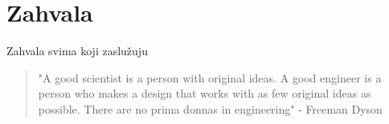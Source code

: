 \section*{Zahvala}
Zahvala svima koji zaslužuju

\begin{quotation}
"A good scientist is a person with original ideas. A good engineer is a person who makes a design that works with as few original ideas as possible. There are no prima donnas in engineering" - Freeman Dyson
\end{quotation}